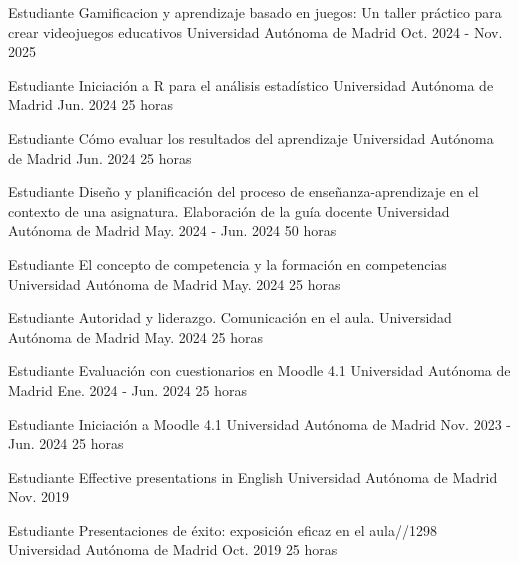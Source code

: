 \begin{cventries}

  \cventry
    {Estudiante} %
    {Gamificacion y aprendizaje basado en juegos: Un taller práctico para crear videojuegos educativos} %
    {Universidad Autónoma de Madrid} %
    {Oct. 2024 - Nov. 2025} %
    {
    }

	  \cventry
    {Estudiante} %
    {Iniciación a R para el análisis estadístico
} %
    {Universidad Autónoma de Madrid} %
    {Jun. 2024} %
    {25 horas}
    
	  \cventry
    {Estudiante} %
    {Cómo evaluar los resultados del aprendizaje} %
    {Universidad Autónoma de Madrid} %
    {Jun. 2024} %
    {25 horas}

	  \cventry
    {Estudiante} %
    {Diseño y planificación del proceso de enseñanza-aprendizaje en el contexto de una asignatura. Elaboración de la guía docente} %
    {Universidad Autónoma de Madrid} %
    {May. 2024 - Jun. 2024} %
    {50 horas}
    
	  \cventry
    {Estudiante} %
    {El concepto de competencia y la formación en competencias} %
    {Universidad Autónoma de Madrid} %
    {May. 2024} %
    {25 horas}

	  \cventry
    {Estudiante} %
    {Autoridad y liderazgo. Comunicación en el aula.} %
    {Universidad Autónoma de Madrid} %
    {May. 2024} %
    {25 horas}

  \cventry
    {Estudiante} %
    {Evaluación con cuestionarios en Moodle 4.1} %
    {Universidad Autónoma de Madrid} %
    {Ene. 2024 - Jun. 2024} %
    {25 horas
    }

  \cventry
    {Estudiante} %
    {Iniciación a Moodle 4.1} %
    {Universidad Autónoma de Madrid} %
    {Nov. 2023 - Jun. 2024} %
    {25 horas}

  \cventry
    {Estudiante} %
    {Effective presentations in English} %
    {Universidad Autónoma de Madrid} %
    {Nov. 2019} %
    {
    }

  \cventry
    {Estudiante} %
    {Presentaciones de éxito: exposición eficaz en el aula//1298} %
    {Universidad Autónoma de Madrid} %
    {Oct. 2019} %
    {25 horas
    }


\end{cventries}
